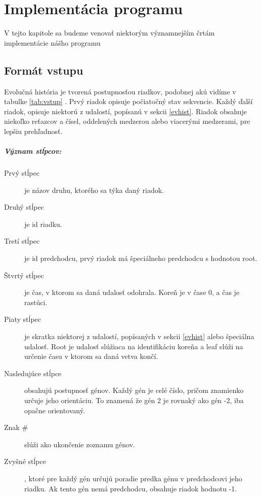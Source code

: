 \chapter{Implementácia programu}
V tejto kapitole sa budeme venovať niektorým významnejším črtám implementácie nášho programu
\section{Formát vstupu}
Evolučná história je tvorená postupnosťou riadkov, podobnej akú vidíme v tabulke  \ref{tab:vstup} . Prvý riadok opisuje počiatočný stav sekvencie.
Každý ďalší riadok, opisuje niektorú z udalostí, popísanú v sekcii \ref{evhist}.
\newline
Riadok obsahuje niekoľko reťazcov a čísel, oddelených medzerou alebo viacerými medzerami, pre lepšiu prehľadnosť.
\paragraph{Význam stĺpcov:}

\begin{description}

\item[Prvý stĺpec] je názov druhu, ktorého sa týka daný riadok.

\item[Druhý stĺpec] je id riadku.

\item[Tretí stĺpec] je id predchodcu, prvý riadok má špeciálneho predchodcu s hodnotou root.

\item[Štvrtý stĺpec] je čas, v ktorom sa daná udalosť odohrala. Koreň je v čase 0, a čas je rastúci.

\item[Piaty stĺpec] je skratka niektorej z udalostí, popísaných v sekcii \ref{evhist} alebo špeciálna udalosť. Root je udalosť slúžiaca na identifikáciu koreňa a leaf slúži na určenie času v ktorom sa daná vetva končí.

\item [Nasledujúce stĺpce] obsahujú postupnosť génov. Každý gén je celé číslo, pričom znamienko určuje jeho orientáciu. To znamená že gén 2 je rovnaký ako gén -2, iba opačne orientovaný.

\item [Znak \#] slúži ako ukončenie zoznamu génov.

\item[Zvyšné stĺpce], ktoré pre každý gén určujú poradie predka génu v predchodcovi jeho riadku. Ak tento gén nemá predchodcu, obsahuje riadok hodnotu -1.

\end{description}

